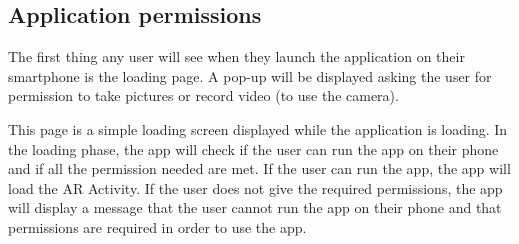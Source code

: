 \subsection{Application permissions}
The first thing any user will see when they launch the application on their smartphone is the loading page. A pop-up will be displayed asking the user for permission to take pictures or record video (to use the camera).

This page is a simple loading screen displayed while the application is loading. In the loading phase, the app will check if the user can run the app on their phone and if all the permission needed are met. If the user can run the app, the app will load the \ac{AR} Activity. If the user does not give the required permissions, the app will display a message that the user cannot run the app on their phone and that  permissions are required in order to use the app.

